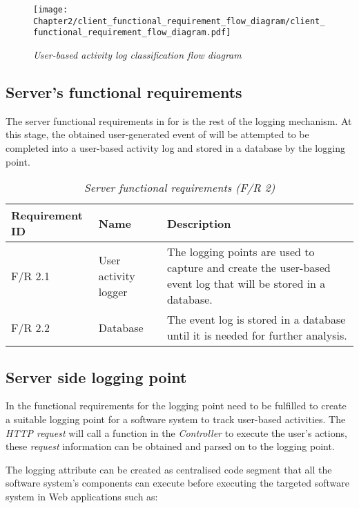\begin{figure}[!htb] %
	\centering %
	\texttt{[image: Chapter2/client\_functional\_requirement\_flow\_diagram/client\_functional\_requirement\_flow\_diagram.pdf]}
	\caption[User-based activity log classification flow diagram]
	{\textit{User-based activity log classification flow diagram}}\label{fig:ch2_user_based_actvity_classification}
\end{figure}

\clearpage

\subsection{Server's functional requirements}\label{sec:ch2_serverFunctionalRequirements}
The server functional requirements in  for  is the rest of the logging mechanism. At this stage, the obtained user-generated event of  will be attempted to be completed into a user-based activity log and stored in a database by the logging point. \par 

\begin{table}[!htb]
	\centering
	\caption[Server functional requirements]
	{\textit{Server functional requirements (F/R 2)}}
	\label{tbl:ch2_serverInterfaceRequirements}
	\begin{tabularx}{\textwidth}{|l|l|X|}
		\hline \textbf{Requirement ID} & \textbf{Name} & \textbf{Description} \\
		\hline F/R 2.1 & User activity logger & The logging points are used to capture and create the user-based event log that will be stored in a database.\\
		\hline F/R 2.2 & Database & The event log is stored in a database until it is needed for further analysis.\\
		\hline
	\end{tabularx}
\end{table}

\subsection{Server side logging point}
In  the functional requirements for the logging point need to be fulfilled to create a suitable logging point for a software system to track user-based activities. The \textit{HTTP request} will call a function in the \textit{Controller} to execute the user's actions, these \textit{request} information can be obtained and parsed on to the logging point.\par The logging attribute can be created as centralised code segment that all the software system's components can execute before executing the targeted software system in Web applications such as:

